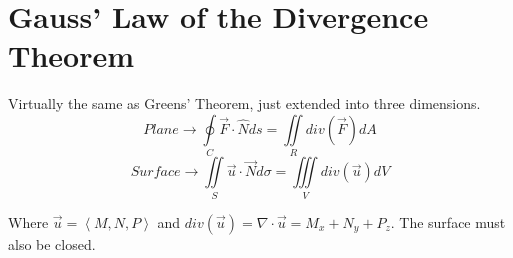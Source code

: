 \documentclass{article}
\newcommand{\nvec}[1]{\left\langle #1 \right\rangle}
\begin{document}
\section{Gauss' Law of the Divergence Theorem}
Virtually the same as Greens' Theorem, just extended into three dimensions.\\
\[
Plane \to \oint\limits_C \vec{F} \cdot \hat{N} ds = \iint\limits_R div(\vec{F})dA
\]
\[
Surface \to \iint\limits_S \vec{u} \cdot \vec{N} d \sigma = \iiint\limits_V div(\vec{u}) dV
\]

Where $\vec{u} = \nvec{M, N, P}$ and $div(\vec{u}) = \nabla \cdot \vec{u} = M_x + N_y + P_z$. The surface must also be closed.
\end{document}
